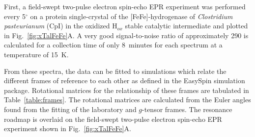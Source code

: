 First, a field-swept two-pulse electron spin-echo EPR experiment was performed every 5$^{\circ}$ on a protein single-crystal of the [FeFe]-hydrogenase of {\em Clostridium pasteurianum} (CpI) in the oxidized H$_{ox}$ stable catalytic intermediate and plotted in Fig.~\ref{fig:xTalFeFe}A. A very good signal-to-noise ratio of approximately 290 is calculated for a collection time of only 8~minutes for each spectrum at a temperature of 15~K. 

From these spectra, the data can be fitted to simulations which relate the different frames of reference to each other as defined in the EasySpin simulation package. Rotational matrices for the relationship of these frames are tabulated in Table~\ref{table:frames}. The rotational matrices are calculated from the Euler angles found from the fitting of the laboratory and $g$-tensor frames. The resonance roadmap is overlaid on the field-swept two-pulse electron spin-echo EPR experiment shown in Fig.~\ref{fig:xTalFeFe}A.

